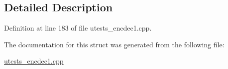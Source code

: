 \subsection{Detailed Description}


Definition at line 183 of file utests\+\_\+encdec1.\+cpp.



The documentation for this struct was generated from the following file\+:\begin{DoxyCompactItemize}
\item 
\hyperlink{utests__encdec1_8cpp}{utests\+\_\+encdec1.\+cpp}\end{DoxyCompactItemize}
